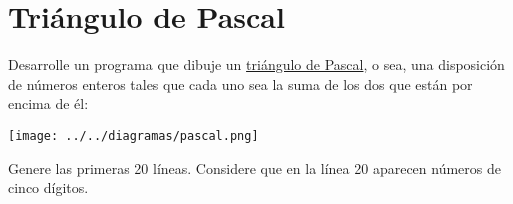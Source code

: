 \section{Triángulo de Pascal}

Desarrolle un programa que dibuje un
\href{http://es.wikipedia.org/wiki/Tri\%C3\%A1ngulo\_de\_Pascal}{triángulo
de Pascal}, o sea, una disposición de números enteros tales que cada uno
sea la suma de los dos que están por encima de él:

\texttt{[image: ../../diagramas/pascal.png]}

Genere las primeras 20 líneas. Considere que en la línea 20 aparecen
números de cinco dígitos.
